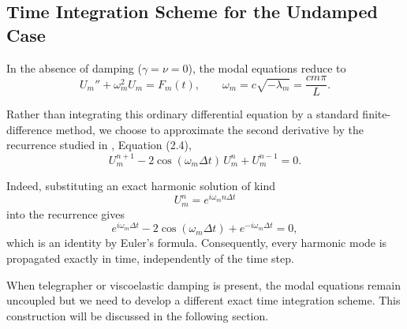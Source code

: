 \documentclass{Configuration_Files/PoliMi3i_thesis}
\begin{document}
\subsection{Time Integration Scheme for the Undamped Case}
In the absence of damping ($\gamma=\nu=0$), the modal equations reduce to
\begin{equation*}
U_m''
+\omega_m^2U_m
=
F_m(t),
\qquad
\omega_m
=
c\sqrt{-\lambda_m}
=
\frac{cm\pi}{L}.
\end{equation*}

Rather than integrating this ordinary differential equation by a standard finite-difference method, we choose to approximate the second derivative by the recurrence studied in \cite{cieslinski_exact_2011}, Equation (2.4),
\begin{equation*}
U_m^{n+1}
-
2\cos(\omega_m\Delta t)\,
U_m^n
+
U_m^{n-1}
=
0.
\end{equation*}

Indeed, substituting an exact harmonic solution of kind
\begin{equation*}
U_m^n
=
e^{i\omega_mn\Delta t}
\end{equation*}
into the recurrence gives
\begin{equation*}
e^{i\omega_m\Delta t}
-
2\cos(\omega_m\Delta t)
+
e^{-i\omega_m\Delta t}
=
0,
\end{equation*}
which is an identity by Euler's formula. Consequently, every harmonic mode is propagated exactly in time, independently of the time step.

When telegrapher or viscoelastic damping is present, the modal equations remain uncoupled but we need to develop a different exact time integration scheme. This construction will be discussed in the following section.
\end{document}
